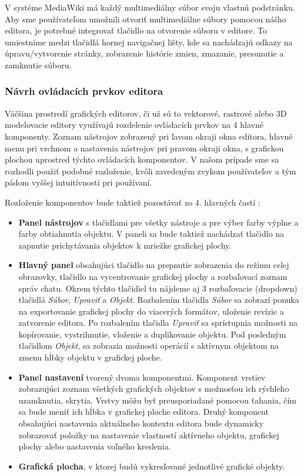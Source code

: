 V systéme MediaWiki má každý multimediálny súbor svoju vlastnú podstránku. Aby sme používateľom umožnili otvoriť multimediálne súbory pomocou nášho editora, je potrebné integrovať tlačidlo na otvorenie súboru v editore. To umiestnime medzi tlačidlá hornej navigačnej lišty, kde sa nachádzajú odkazy na úpravu/vytvorenie stránky, zobrazenie histórie zmien, zmazanie, presunutie a zamknutie súboru.

\subsubsection{Návrh ovládacích prvkov editora}
Väčšina prostredí grafických editorov, či už sú to vektorové, rastrové alebo 3D modelovacie editory využívajú rozdelenie ovládacích prvkov na 4 hlavné komponenty. Zoznam nástrojov zobrazený pri ľavom okraji okna editora, hlavné menu pri vrchnom a nastavenia nástrojov pri pravom okraji okna, s grafickou plochou uprostred týchto ovládacích komponentov. V našom prípade sme sa rozhodli použiť podobné rozloženie, kvôli zavedeným zvykom používateľov a tým pádom vyššej intuitívnosti pri používaní.

Rozloženie komponentov bude taktiež pozostávať zo 4. hlavných častí :
\begin{itemize}
	\item \textbf{Panel nástrojov} s tlačidlami pre všetky nástroje a pre výber farby výplne a farby obtiahnutia objektu. V paneli sa bude taktiež nachádzať tlačidlo na zapnutie prichytávania objektov k mriežke grafickej plochy.

	\item \textbf{Hlavný panel} obsahujúci tlačidlo na prepnutie zobrazenia do režimu celej obrazovky, tlačidlo na vycentrovanie grafickej plochy a rozbaľovací zoznam správ chatu. Okrem týchto tlačidiel tu nájdeme aj 3 rozbaľovacie (dropdown) tlačidlá \textit{Súbor}, \textit{Upraviť} a \textit{Objekt}. Rozbalením tlačidla \textit{Súbor} sa zobrazí ponuka na exportovanie grafickej plochy do viacerých formátov, uloženie revízie a zatvorenie editora. Po rozbalením tlačidla \textit{Upraviť} sa sprístupnia možnosti na kopírovanie, vystrihnutie, vloženie a duplikovanie objektu. Pod posledným tlačidlom \textit{Objekt}, sa zobrazia možnosti operácií s aktívnym objektom na zmenu hĺbky objektu v grafickej ploche.

	\item \textbf{Panel nastavení} tvorený dvoma komponentmi. Komponent vrstiev zobrazujúci zoznam všetkých grafických objektov s možnosťou ich rýchleho uzamknutia, skrytia. Vrstvy môžu byť preusporiadané pomocou ťahania, čím sa bude meniť ich hĺbka v grafickej ploche editora. Druhý komponent obsahujúci nastavenia aktuálneho kontextu editora bude dynamicky zobrazovať položky na nastavenie vlastností aktívneho objektu, grafickej plochy alebo nastavenia voľného kreslenia.

	\item \textbf{Grafická plocha}, v ktorej budú vykresľované jednotlivé grafické objekty.
\end{itemize}


